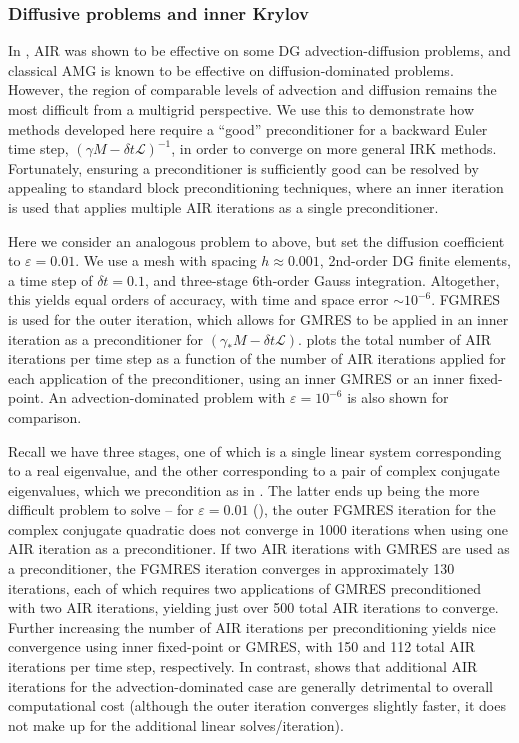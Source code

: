 \documentclass[review]{siamart}
\begin{document}
\subsubsection{Diffusive problems and inner Krylov}\label{sec:numerics:dg:diff}

In \cite{Manteuffel:2019}, AIR was shown to be effective on some DG advection-diffusion
problems, and classical AMG is known to be effective on diffusion-dominated
problems. However, the region of comparable levels of advection and diffusion
remains the most difficult from a multigrid perspective. We use this to
demonstrate how methods developed here require a ``good'' preconditioner
for a backward Euler time step, $(\gamma M - \delta t \mathcal{L})^{-1}$,
in order to converge on more general IRK
methods. Fortunately, ensuring a preconditioner is sufficiently good can be
resolved by appealing to standard block preconditioning techniques, where an inner
iteration is used that applies multiple AIR iterations as a single preconditioner.

Here we consider an analogous problem to above, but set the diffusion coefficient
to $\varepsilon = 0.01$. We use a mesh with spacing $h \approx 0.001$, 2nd-order
DG finite elements, a time step of $\delta t = 0.1$, and three-stage 6th-order
Gauss integration. Altogether, this yields equal orders of accuracy, with time and
space error $\sim10^{-6}$. FGMRES \cite{saad1993flexible} is used for the
outer iteration, which allows for GMRES to be applied in an inner iteration
as a preconditioner for $(\gamma_* M - \delta t \mathcal{L})$.  plots the
total number of AIR iterations per time step as a function of the number of
AIR iterations applied for each application of the preconditioner, using an
inner GMRES or an inner fixed-point. An advection-dominated problem
with $\varepsilon = 10^{-6}$ is also shown for comparison.

Recall we have three stages, one of which is a single linear system corresponding
to a real eigenvalue, and the other corresponding to a pair of complex conjugate
eigenvalues, which we precondition as in . The latter ends up being
the more difficult problem to solve -- for $\varepsilon =0.01$ (),
the outer FGMRES iteration for the complex conjugate quadratic does not converge in
1000 iterations when using one AIR iteration as a preconditioner.
If two AIR iterations with GMRES are used as a preconditioner,
the FGMRES iteration converges in approximately 130 iterations, each of which
requires two applications of GMRES preconditioned with two AIR iterations,
yielding just over 500 total AIR iterations to converge. Further increasing
the number of AIR iterations per preconditioning yields nice convergence
using inner fixed-point or GMRES, with 150 and 112 total AIR iterations per
time step, respectively. In contrast,  shows that
additional AIR iterations for the advection-dominated case are generally
detrimental to overall computational cost (although the outer iteration
converges slightly faster, it does not make up for the additional linear
solves/iteration).
\end{document}

